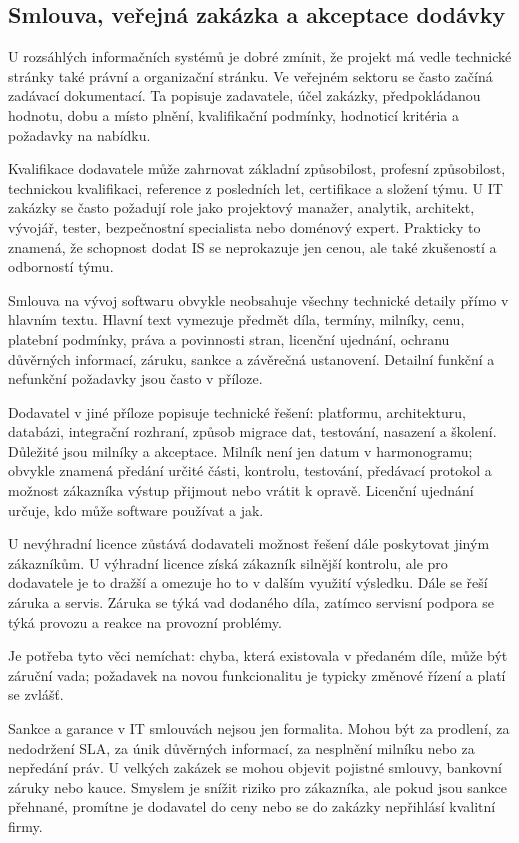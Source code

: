 \subsection*{Smlouva, veřejná zakázka a akceptace dodávky}

U rozsáhlých informačních systémů je dobré zmínit, že projekt má vedle technické stránky také právní a organizační stránku. Ve veřejném sektoru se často začíná zadávací dokumentací. Ta popisuje zadavatele, účel zakázky, předpokládanou hodnotu, dobu a místo plnění, kvalifikační podmínky, hodnoticí kritéria a požadavky na nabídku.

Kvalifikace dodavatele může zahrnovat základní způsobilost, profesní způsobilost, technickou kvalifikaci, reference z posledních let, certifikace a složení týmu. U IT zakázky se často požadují role jako projektový manažer, analytik, architekt, vývojář, tester, bezpečnostní specialista nebo doménový expert. Prakticky to znamená, že schopnost dodat IS se neprokazuje jen cenou, ale také zkušeností a odborností týmu.

Smlouva na vývoj softwaru obvykle neobsahuje všechny technické detaily přímo v hlavním textu. Hlavní text vymezuje předmět díla, termíny, milníky, cenu, platební podmínky, práva a povinnosti stran, licenční ujednání, ochranu důvěrných informací, záruku, sankce a závěrečná ustanovení. Detailní funkční a nefunkční požadavky jsou často v příloze.

Dodavatel v jiné příloze popisuje technické řešení: platformu, architekturu, databázi, integrační rozhraní, způsob migrace dat, testování, nasazení a školení. Důležité jsou milníky a akceptace. Milník není jen datum v harmonogramu; obvykle znamená předání určité části, kontrolu, testování, předávací protokol a možnost zákazníka výstup přijmout nebo vrátit k opravě. Licenční ujednání určuje, kdo může software používat a jak.

U nevýhradní licence zůstává dodavateli možnost řešení dále poskytovat jiným zákazníkům. U výhradní licence získá zákazník silnější kontrolu, ale pro dodavatele je to dražší a omezuje ho to v dalším využití výsledku. Dále se řeší záruka a servis. Záruka se týká vad dodaného díla, zatímco servisní podpora se týká provozu a reakce na provozní problémy.

Je potřeba tyto věci nemíchat: chyba, která existovala v předaném díle, může být záruční vada; požadavek na novou funkcionalitu je typicky změnové řízení a platí se zvlášť.

Sankce a garance v IT smlouvách nejsou jen formalita. Mohou být za prodlení, za nedodržení SLA, za únik důvěrných informací, za nesplnění milníku nebo za nepředání práv. U velkých zakázek se mohou objevit pojistné smlouvy, bankovní záruky nebo kauce. Smyslem je snížit riziko pro zákazníka, ale pokud jsou sankce přehnané, promítne je dodavatel do ceny nebo se do zakázky nepřihlásí kvalitní firmy.

